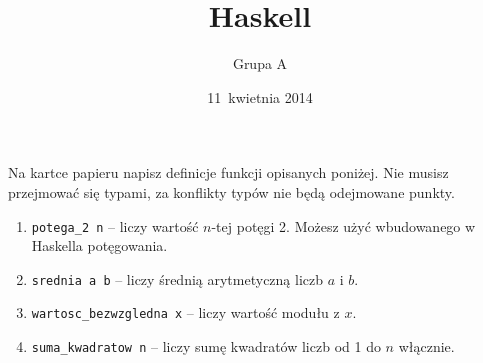 \documentclass[12pt,a4paper]{article}
\title{Haskell}
\author{Grupa A}
\date{11~kwietnia 2014}
\begin{document}
\maketitle

Na kartce papieru napisz definicje funkcji opisanych poniżej. Nie musisz
przejmować się typami, za konflikty typów nie będą odejmowane punkty.

\begin{enumerate}
  \item {
    \texttt{potega\_2 n} -- liczy wartość $n$-tej potęgi 2. 
    Możesz użyć wbudowanego w Haskella potęgowania.
  }

  \item {
    \texttt{srednia a b} -- liczy średnią arytmetyczną liczb $a$ i $b$.
  }

  \item {
    \texttt{wartosc\_bezwzgledna x} -- liczy wartość modułu z $x$.
  }

  \item {
    \texttt{suma\_kwadratow n} -- liczy sumę kwadratów liczb od 1 do $n$ 
    włącznie.
  }
\end{enumerate}
\end{document}
